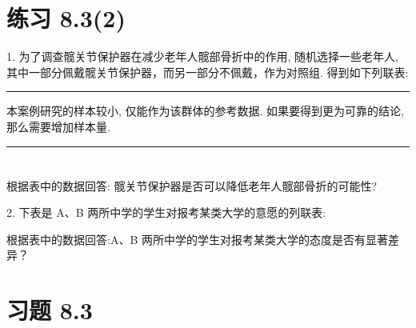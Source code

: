 \documentclass[10pt]{article}
\newcommand{\HRule}{\begin{center}\rule{0.9\linewidth}{0.2mm}\end{center}}
\begin{document}
\section*{练习 8.3(2)}

1. 为了调查髋关节保护器在减少老年人髋部骨折中的作用, 随机选择一些老年人, 其中一部分佩戴髋关节保护器，而另一部分不佩戴，作为对照组. 得到如下列联表:

\HRule

本案例研究的样本较小, 仅能作为该群体的参考数据. 如果要得到更为可靠的结论, 那么需要增加样本量.

\HRule

\section*{}

\begin{center}
\end{center}

根据表中的数据回答: 髋关节保护器是否可以降低老年人髋部骨折的可能性?

2. 下表是 A、B 两所中学的学生对报考某类大学的意愿的列联表:

\begin{center}
\end{center}

根据表中的数据回答:A、B 两所中学的学生对报考某类大学的态度是否有显著差异？

\section*{习题 8.3}
\end{document}

